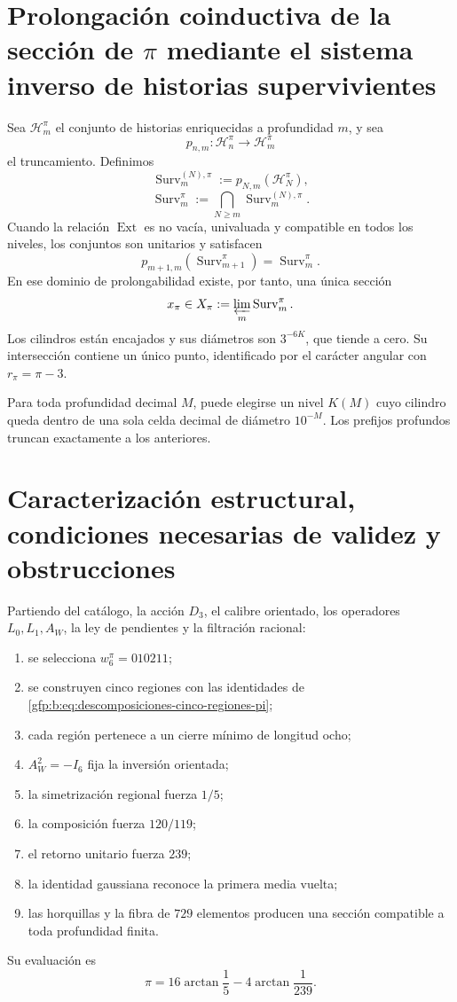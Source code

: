 \section{Prolongación coinductiva de la sección de \(\pi\) mediante el sistema inverso de historias supervivientes}

Sea \(\mathcal H_m^\pi\) el conjunto de historias enriquecidas a profundidad
\(m\), y sea
\[
 p_{n,m}:\mathcal H_n^\pi\longrightarrow\mathcal H_m^\pi
\]
el truncamiento. Definimos
\[
 \operatorname{Surv}_m^{(N),\pi}
 :=p_{N,m}(\mathcal H_N^\pi),
\]
\[
 \operatorname{Surv}_m^\pi
 :=\bigcap_{N\geq m}\operatorname{Surv}_m^{(N),\pi}.
\]
Cuando la relación \(\operatorname{Ext}\) es no vacía, univaluada y
compatible en todos los niveles, los conjuntos son unitarios y satisfacen
\[
 p_{m+1,m}(\operatorname{Surv}_{m+1}^{\pi})
 =\operatorname{Surv}_{m}^{\pi}.
\]
En ese dominio de prolongabilidad existe, por tanto, una única sección
\[
 x_\pi\in
 X_\pi:=\varprojlim_m\operatorname{Surv}_m^\pi.
\]
Los cilindros están encajados y sus diámetros son \(3^{-6K}\), que tiende a
cero. Su intersección contiene un único punto, identificado por el carácter
angular con \(r_\pi=\pi-3\).

Para toda profundidad decimal \(M\), puede elegirse un nivel \(K(M)\) cuyo
cilindro queda dentro de una sola celda decimal de diámetro \(10^{-M}\).
Los prefijos profundos truncan exactamente a los anteriores.

\section{Caracterización estructural, condiciones necesarias de validez y obstrucciones}

\begin{theorem}
\label{gfp:b:thm:caracterizacion-final-pi-autonoma}
Partiendo del catálogo, la acción \(D_3\), el calibre orientado, los
operadores \(L_0,L_1,A_W\), la ley de pendientes y la filtración racional:
\begin{enumerate}
 \item se selecciona \(w_6^\pi=010211\);
 \item se construyen cinco regiones con las identidades de
       \eqref{gfp:b:eq:descomposiciones-cinco-regiones-pi};
 \item cada región pertenece a un cierre mínimo de longitud ocho;
 \item \(A_W^2=-I_6\) fija la inversión orientada;
 \item la simetrización regional fuerza \(1/5\);
 \item la composición fuerza \(120/119\);
 \item el retorno unitario fuerza \(239\);
 \item la identidad gaussiana reconoce la primera media vuelta;
 \item las horquillas y la fibra de \(729\) elementos producen una sección
       compatible a toda profundidad finita.
\end{enumerate}
Su evaluación es
\[
 \boxed{\pi=16\arctan\frac15-4\arctan\frac1{239}.}
\]
\end{theorem}

